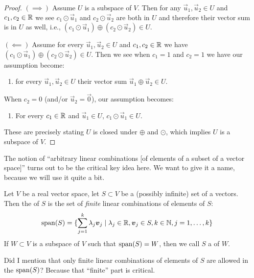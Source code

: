 \begin{proof}
$(\implies)$ Assume $U$ is a subspace of $V$.
Then for any $\vec{u}_{1},\vec{u}_{2}\in U$
and $c_{1},c_{2}\in\mathbb{R}$ we see $c_{1}\odot\vec{u}_{1}$ and $c_{2}\odot\vec{u}_{2}$
are both in $U$ and therefore their vector sum is in $U$ as well, i.e.,
$(c_{1}\odot\vec{u}_{1})\oplus(c_{2}\odot\vec{u}_{2})\in U$.

$(\impliedby)$ Assume for every $\vec{u}_{1},\vec{u}_{2}\in U$
and $c_{1},c_{2}\in\mathbb{R}$ we have $(c_{1}\odot \vec{u}_{1})\oplus(c_{2}\odot \vec{u}_{2})\in U$.
Then we see when $c_{1}=1$ and $c_{2}=1$ we have our assumption become:
\begin{enumerate}[label=(\alph*)]
\item for every $\vec{u}_{1},\vec{u}_{2}\in U$ their vector sum
  $\vec{u}_{1}\oplus\vec{u}_{2}\in U$.
\end{enumerate}
When $c_{2}=0$ (and/or $\vec{u}_{2}=\vec{0}$), our assumption becomes:
\begin{enumerate}[resume*]
\item For every $c_{1}\in\mathbb{R}$ and $\vec{u}_{1}\in U$,
  $c_{1}\odot\vec{u}_{1}\in U$.
\end{enumerate}
These are precisely stating $U$ is closed under $\oplus$ and $\odot$,
which implies $U$ is a subspace of $V$.
\end{proof}

\begin{remark}
The notion of ``arbitrary linear combinations [of elements of a subset
  of a vector space]'' turns out to be the critical key idea here. We
want to give it a name, because we will use it quite a bit.
\end{remark}

\begin{definition}
Let $V$ be a real vector space, let $S\subset V$ be a (possibly
infinite) set of a vectors. Then the  of $S$ is the set of
\emph{finite} linear combinations of elements of $S$:
\begin{equation}
\operatorname{span}(S) =
\{\sum^{k}_{j=1}\lambda_{j}\boldsymbol{v}_{j}\mid\lambda_{j}\in\mathbb{R},\boldsymbol{v}_{j}\in S,k\in\mathbb{N},j=1,\dots,k\}
\end{equation}
If $W\subset V$ is a subspace of $V$ such that $\operatorname{span}(S) = W$, then we
call $S$ a  of $W$.
\end{definition}

\begin{remark}
Did I mention that only finite linear combinations of elements of $S$
are allowed in the $\operatorname{span}(S)$? Because that ``finite'' part is critical. 
\end{remark}

